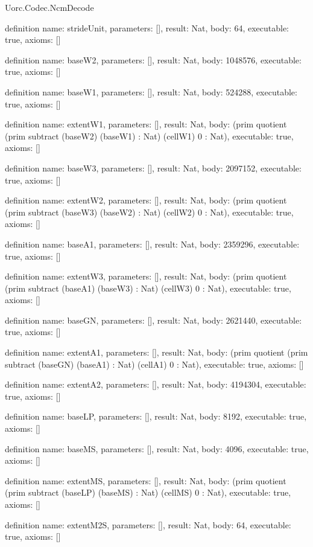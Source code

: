 \begin{lexlean}{Uorc.Codec.NcmDecode}
\begin{semanticmodule}
definition{
  name: strideUnit,
  parameters: [],
  result: Nat,
  body: 64,
  executable: true,
  axioms: []
}

definition{
  name: baseW2,
  parameters: [],
  result: Nat,
  body: 1048576,
  executable: true,
  axioms: []
}

definition{
  name: baseW1,
  parameters: [],
  result: Nat,
  body: 524288,
  executable: true,
  axioms: []
}

definition{
  name: extentW1,
  parameters: [],
  result: Nat,
  body: (prim quotient (prim subtract (baseW2) (baseW1) : Nat) (cellW1) 0 : Nat),
  executable: true,
  axioms: []
}

definition{
  name: baseW3,
  parameters: [],
  result: Nat,
  body: 2097152,
  executable: true,
  axioms: []
}

definition{
  name: extentW2,
  parameters: [],
  result: Nat,
  body: (prim quotient (prim subtract (baseW3) (baseW2) : Nat) (cellW2) 0 : Nat),
  executable: true,
  axioms: []
}

definition{
  name: baseA1,
  parameters: [],
  result: Nat,
  body: 2359296,
  executable: true,
  axioms: []
}

definition{
  name: extentW3,
  parameters: [],
  result: Nat,
  body: (prim quotient (prim subtract (baseA1) (baseW3) : Nat) (cellW3) 0 : Nat),
  executable: true,
  axioms: []
}

definition{
  name: baseGN,
  parameters: [],
  result: Nat,
  body: 2621440,
  executable: true,
  axioms: []
}

definition{
  name: extentA1,
  parameters: [],
  result: Nat,
  body: (prim quotient (prim subtract (baseGN) (baseA1) : Nat) (cellA1) 0 : Nat),
  executable: true,
  axioms: []
}

definition{
  name: extentA2,
  parameters: [],
  result: Nat,
  body: 4194304,
  executable: true,
  axioms: []
}

definition{
  name: baseLP,
  parameters: [],
  result: Nat,
  body: 8192,
  executable: true,
  axioms: []
}

definition{
  name: baseMS,
  parameters: [],
  result: Nat,
  body: 4096,
  executable: true,
  axioms: []
}

definition{
  name: extentMS,
  parameters: [],
  result: Nat,
  body: (prim quotient (prim subtract (baseLP) (baseMS) : Nat) (cellMS) 0 : Nat),
  executable: true,
  axioms: []
}

definition{
  name: extentM2S,
  parameters: [],
  result: Nat,
  body: 64,
  executable: true,
  axioms: []
}


\end{semanticmodule}
\end{lexlean}
